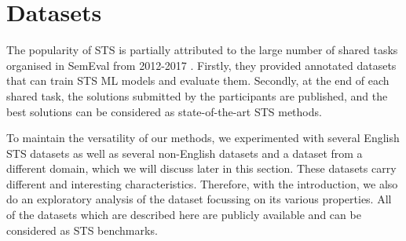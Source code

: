 \section{Datasets}
\label{sec:sts_intro_datsets}
The popularity of STS is partially attributed to the large number of shared tasks organised in SemEval from 2012-2017 \autocite{agirre-etal-2012-semeval,agirre-etal-2013-sem,agirre-etal-2014-semeval,agirre-etal-2015-semeval,agirre-etal-2016-semeval,cer-etal-2017-semeval}. Firstly, they provided annotated datasets that can train STS ML models and evaluate them. Secondly, at the end of each shared task, the solutions submitted by the participants are published, and the best solutions can be considered as state-of-the-art STS methods. 

To maintain the versatility of our methods, we experimented with several English STS datasets as well as several non-English datasets and a dataset from a different domain, which we will discuss later in this section. These datasets carry different and interesting characteristics. Therefore, with the introduction, we also do an exploratory analysis of the dataset focussing on its various properties. All of the datasets which are described here are publicly available and can be considered as STS benchmarks. 


